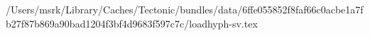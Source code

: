 /Users/msrk/Library/Caches/Tectonic/bundles/data/6ffe055852f8faf66c0acbe1a7fb27f87b869a90bad1204f3bf4d9683f597c7c/loadhyph-sv.tex